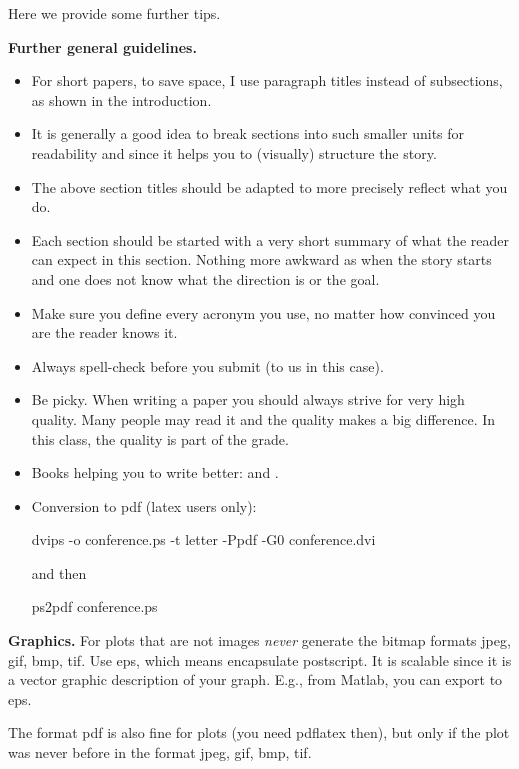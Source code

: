 \documentclass[letterpaper]{article}
\newcommand{\mypar}[1]{{\bf #1.}}
\theoremstyle{definition}
\begin{document}
Here we provide some further tips.

\mypar{Further general guidelines}

\begin{itemize}
\item For short papers, to save space, I use paragraph titles instead of
subsections, as shown in the introduction.

\item It is generally a good idea to break sections into such smaller
units for readability and since it helps you to (visually) structure the story.

\item The above section titles should be adapted to more precisely
reflect what you do.

\item Each section should be started with a very
short summary of what the reader can expect in this section. Nothing
more awkward as when the story starts and one does not know what the
direction is or the goal.

\item Make sure you define every acronym you use, no matter how
convinced you are the reader knows it.

\item Always spell-check before you submit (to us in this case).

\item Be picky. When writing a paper you should always strive for very
high quality. Many people may read it and the quality makes a big difference.
In this class, the quality is part of the grade.

\item Books helping you to write better: \cite{Higham:98} and \cite{Strunk:00}.

\item Conversion to pdf (latex users only): 

dvips -o conference.ps -t letter -Ppdf -G0 conference.dvi

and then

ps2pdf conference.ps
\end{itemize}

\mypar{Graphics} For plots that are not images {\em never} generate the bitmap formats
jpeg, gif, bmp, tif. Use eps, which means encapsulate postscript. It is
scalable since it is a vector graphic description of your graph. E.g.,
from Matlab, you can export to eps.

The format pdf is also fine for plots (you need pdflatex then), but only if the plot was never before in the format 
jpeg, gif, bmp, tif.

\fi



\end{document}

